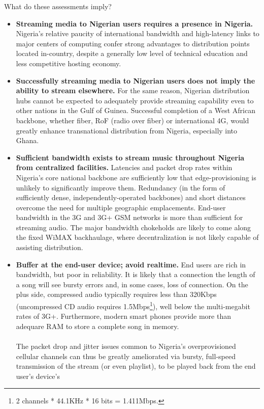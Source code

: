\documentclass[]{sigplanconf}
\begin{document}
What do these assessments imply?

\begin{itemize}
\item \textbf{Streaming media to Nigerian users requires a presence in Nigeria.}
Nigeria's relative paucity of international bandwidth and high-latency links to
major centers of computing confer strong advantages to distribution points
located in-country, despite a generally low level of technical education and
less competitive hosting economy.
\item \textbf{Successfully streaming media to Nigerian users does not imply
the ability to stream elsewhere.} For the same reason, Nigerian distribution
hubs cannot be expected to adequately provide streaming capability even to
other nations in the Gulf of Guinea. Successful completion of a West African
backbone, whether fiber, RoF (radio over fiber) or international 4G, would
greatly enhance transnational distribution from Nigeria, especially into Ghana.
\item \textbf{Sufficient bandwidth exists to stream music throughout Nigeria
from centralized facilities.} Latencies and packet drop rates within Nigeria's 
core national backbone are sufficiently low that edge-provisioning
is unlikely to significantly improve them. Redundancy (in the form
of sufficiently dense, independently-operated backbones) and short distances
overcome the need for multiple geographic emplacements. End-user bandwidth in
the 3G and 3G+ GSM networks is more than sufficient for streaming audio. The
major bandwidth chokeholds are likely to come along the fixed WiMAX backhaulage,
where decentralization is not likely capable of assisting distribution.
\item \textbf{Buffer at the end-user device; avoid realtime.} End users are
rich in bandwidth, but poor in reliability. It is likely that a connection the
length of a song will see bursty errors and, in some cases, loss of connection.
On the plus side, compressed audio typically requires less than 320Kbps (uncompressed
CD audio requires 1.5Mbps\footnote{2 channels * 44.1KHz * 16 bits = 1.411Mbps.}),
well below the multi-megabit rates of 3G+. Furthermore, modern smart phones provide
more than adequare RAM to store a complete song in memory.
\\
\\
The packet drop and jitter issues common to Nigeria's overprovisioned cellular
channels can thus be greatly ameliorated via bursty, full-speed transmission of
the stream (or even playlist), to be played back from the end user's device's

\end{itemize}
\end{document}
